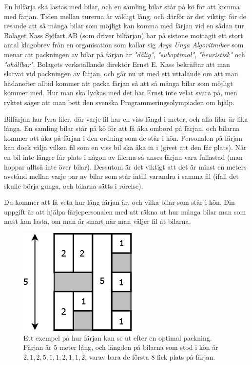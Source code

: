 En bilfärja ska lastas med bilar, och en samling bilar står på kö för att komma med färjan. Tiden mellan turerna är väldigt lång, och därför är det viktigt för de resande att så många bilar som möjligt kan komma med färjan vid en sådan tur. Bolaget Kass Sjöfart AB (som driver bilfärjan) har på sistone mottagit ett stort antal klagobrev från en organisation som kallar sig \emph{Arga Unga Algoritmiker} som menar att packningen av bilar på färjan är \emph{"dålig"}, \emph{"suboptimal"}, \emph{"heuristisk"} och \emph{"ohållbar"}. Bolagets verkställande direktör Ernst E. Kass bekräftar att man slarvat vid packningen av färjan, och går nu ut med ett uttalande om att man hädanefter alltid kommer att packa färjan så att så många bilar som möjligt kommer med. Hur man ska lyckas med det har Ernst inte velat svara på, men ryktet säger att man bett den svenska Programmeringsolympiaden om hjälp.

Bilfärjan har fyra filer, där varje fil har en viss längd i meter, och alla filar är lika långa. En samling bilar står på kö för att få åka ombord på färjan, och bilarna kommer att åka på färjan i den ordning som de står i kön. Personalen på färjan kan dock välja vilken fil som en viss bil ska åka in i (givet att den får plats). När en bil inte längre får plats i någon av filerna så anses färjan vara fullastad (man hoppar alltså inte över bilar). Dessutom är det viktigt att det är minst en meters avstånd mellan varje par av bilar som står intill varandra i samma fil (ifall det skulle börja gunga, och bilarna sätts i rörelse).

Du kommer att få veta hur lång färjan är, och vilka bilar som står i kön. Din uppgift är att hjälpa färjepersonalen med att räkna ut hur många bilar man som mest kan lasta, om man är smart när man väljer fil åt bilarna.

\begin{figure}[!h]
\begin{center}
\includegraphics[scale=0.5]{farjan}
\end{center}
\caption{Ett exempel på hur färjan kan se ut efter en optimal packning. Färjan är $5$ meter lång, och längden på bilarna som stod i kön är $2, 1, 2, 5, 1, 1, 2, 1, 1, 2$, varav bara de första $8$ fick plats på färjan.}
\label{fig1}
\end{figure}

